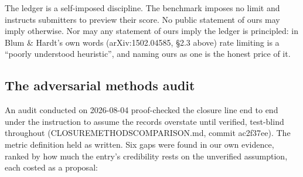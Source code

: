 \documentclass[11pt,a4paper]{article}
\newcommand{\breakus}{\textunderscore\allowbreak}
\newcommand{\code}[1]{{\small\ttfamily\let\_\breakus #1}}
\newcommand{\artifact}[1]{{\footnotesize\ttfamily\let\_\breakus #1}}
\begin{document}
The ledger is a self-imposed discipline. The benchmark imposes no limit and instructs
submitters to preview their score. No public statement of ours may imply otherwise. Nor
may any statement of ours imply the ledger is principled: in Blum \& Hardt's own words
(arXiv:1502.04585, \S2.3 above) rate limiting is a ``poorly understood heuristic'', and
naming ours as one is the honest price of it.

\subsection{The adversarial methods audit}
\label{sec:audit}

An audit conducted on 2026-08-04 proof-checked the closure line end to end under the
instruction to assume the records overstate until verified, test-blind throughout
(\artifact{CLOSURE\_METHODS\_COMPARISON.md}, commit \code{ac2f37ee}). The metric definition
held as written. Six gaps were found in our own evidence, ranked by how much the entry's
credibility rests on the unverified assumption, each costed as a proposal:
\end{document}
